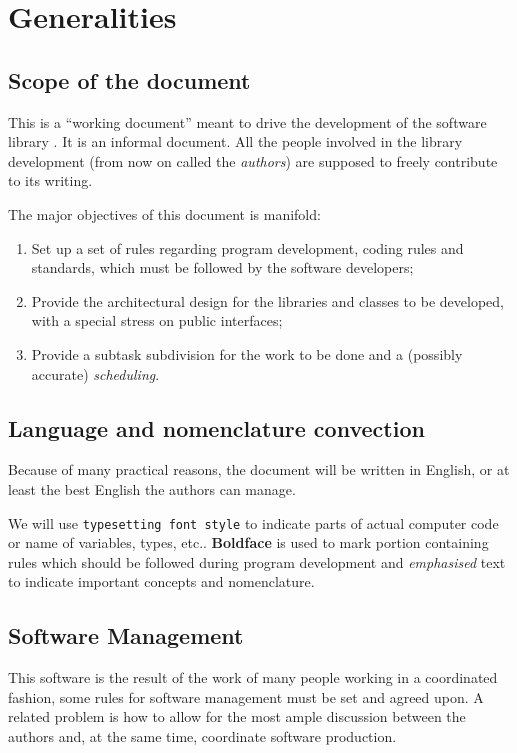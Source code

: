 
\chapter{Generalities}
\label{cha:generalities}

\section{Scope of the document}
\label{sec:scope-document}

This is a ``working document'' meant to drive the development of the
software library \thelibrary. It is an informal document. All the
people involved in the library development (from now on called the
\emph{authors}) are supposed to freely contribute to its writing.

The major objectives of this document is manifold:
\begin{enumerate}
\item Set up a set of rules regarding program development, coding rules
  and standards, which must be followed by the software developers;
\item Provide the architectural design for the libraries and classes
  to be developed, with a special stress on public interfaces;
\item Provide a subtask subdivision for the work to be done and a
  (possibly accurate) \emph{scheduling}.
\end{enumerate}

\section{Language and nomenclature convection} 
\label{sec:lang-nomencl-conv}

Because of many practical reasons, the document will be written in
English, or at least the best English the authors can manage.

We will use \texttt{typesetting font style} to indicate parts of
actual computer code or name of variables, types, etc..
\textbf{Boldface} is used to mark portion containing rules which
should be followed during program development and \emph{emphasised}
text to indicate important concepts and nomenclature.
 
\section{Software Management} 
\label{sec:software-management}

This software is the result of the work of many people working in a
coordinated fashion, some rules for software management
must be set and agreed upon. A related problem is how to allow for the most ample discussion
between the authors and, at the same time, coordinate  software
production.

